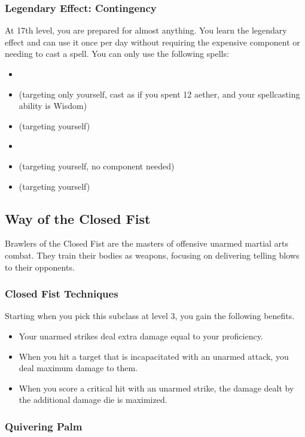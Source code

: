 \subsubsection{Legendary Effect: Contingency}
At 17th level, you are prepared for almost anything. You learn the legendary effect  and can use it once per day without requiring the expensive component or needing to cast a spell. You can only use the following spells:
\begin{itemize}
	\item {}
	\item {} (targeting only yourself, cast as if you spent 12 aether, and your spellcasting ability is Wisdom)
	\item {} (targeting yourself)
	\item {}
	\item {} (targeting yourself, no component needed)
	\item {} (targeting yourself)
\end{itemize}

\subsection{Way of the Closed Fist}
Brawlers of the Closed Fist are the masters of offensive unarmed martial arts combat. They train their bodies as weapons, focusing on delivering telling blows to their opponents.

\subsubsection{Closed Fist Techniques}
Starting when you pick this subclass at level 3, you gain the following benefits.
\begin{itemize}
	\item Your unarmed strikes deal extra damage equal to your proficiency.
	\item When you hit a target that is incapacitated with an unarmed attack, you deal maximum damage to them.
	\item When you score a critical hit with an unarmed strike, the damage dealt by the additional damage die is maximized.
\end{itemize}

\subsubsection{Quivering Palm}

